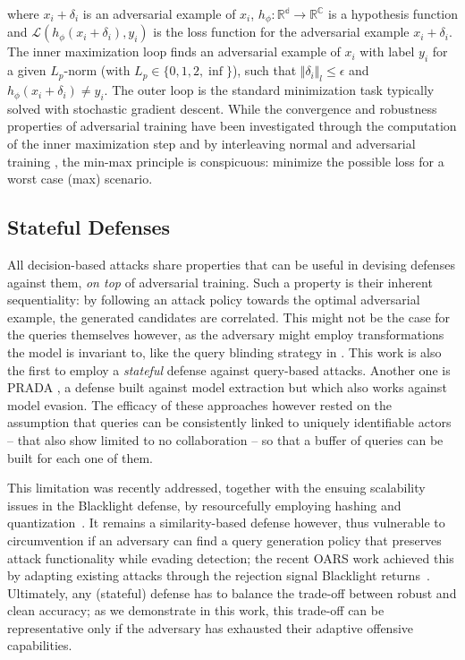 \noindent where $x_i + \delta_i$ is an adversarial example of $x_i$, $h_\phi : \mathbb{R^d} \rightarrow \mathbb{R^C}$ is a hypothesis function and $\mathcal{L}(h_\phi(x_i + \delta_i), y_i)$ is the loss function for the adversarial example $x_i + \delta_i$.
The inner maximization loop finds an adversarial example of $x_i$ with label $y_i$ for a given $L_p$-norm (with $L_p \in \{0,1,2,\inf\}$), such that $\Vert \delta_i\Vert_{l} \leq \epsilon$ and $h_\phi(x_i + \delta_i) \neq y_i$.
The outer loop is the standard minimization task typically solved with stochastic gradient descent.
While the convergence and robustness properties of adversarial training have been investigated through the computation of the inner maximization step and by interleaving normal and adversarial training \cite{wang2019convergence}, the min-max principle is conspicuous: minimize the possible loss for a worst case (max) scenario.

\subsection{Stateful Defenses}
All decision-based attacks share properties that can be useful in devising defenses against them, \textit{on top} of adversarial training.
Such a property is their inherent sequentiality: by following an attack policy towards the optimal adversarial example, the generated candidates are correlated.
This might not be the case for the queries themselves however, as the adversary might employ transformations the model is invariant to, like the query blinding strategy in \cite{chen2020stateful}.
This work is also the first to employ a \emph{stateful} defense against query-based attacks.
Another one is PRADA \cite{juuti2019prada}, a defense built against model extraction but which also works against model evasion.
The efficacy of these approaches however rested on the assumption that queries can be consistently linked to uniquely identifiable actors -- that also show limited to no collaboration -- so that a buffer of queries can be built for each one of them.

This limitation was recently addressed, together with the ensuing scalability issues in the Blacklight defense, by resourcefully employing hashing and quantization~\cite{li2022blacklight}.
It remains a similarity-based defense however, thus vulnerable to circumvention if an adversary can find a query generation policy that preserves attack functionality while evading detection; the recent OARS work achieved this by adapting existing attacks through the rejection signal Blacklight returns~\cite{feng2023stateful}.
Ultimately, any (stateful) defense has to balance the trade-off between robust and clean accuracy; as we demonstrate in this work, this trade-off can be representative only if the adversary has exhausted their adaptive offensive capabilities.

